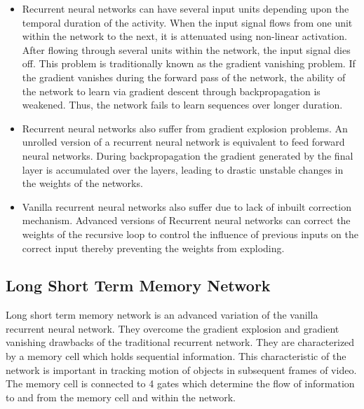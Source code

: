 \documentclass[sigconf]{acmart}
\begin{document}
\begin{itemize}
\setlength\itemsep{1em}
\item Recurrent neural networks can have several input units depending upon the temporal duration of the activity. When the input signal flows from one unit within the network to the next, it is attenuated using non-linear activation. After flowing through several units within the network, the input signal dies off. This problem is traditionally known as the gradient vanishing problem. If the gradient vanishes during the forward pass of the network, the ability of the network to learn via gradient descent through backpropagation is weakened. Thus, the network fails to learn sequences over longer duration.

\item Recurrent neural networks also suffer from gradient explosion problems. An unrolled version of a recurrent neural network is equivalent to feed forward neural networks. During backpropagation the gradient generated by the final layer is accumulated over the layers, leading to drastic unstable changes in the weights of the networks.

\item Vanilla recurrent neural networks also suffer due to lack of inbuilt correction mechanism. Advanced versions of Recurrent neural networks can correct the weights of the recursive loop to control the influence of previous inputs on the correct input thereby preventing the weights from exploding.

\end{itemize}

\subsection{Long Short Term Memory Network}

Long short term memory network \cite{Hochreiter:1997:LSM:1246443.1246450} is an advanced variation of the vanilla recurrent neural network. They overcome the gradient explosion and gradient vanishing drawbacks of the traditional recurrent network. They are characterized by a memory cell which holds sequential information. This characteristic of the network is important in tracking motion of objects in subsequent frames of video. The memory cell is connected to 4 gates which determine the flow of information to and from the memory cell and within the network.
\end{document}
